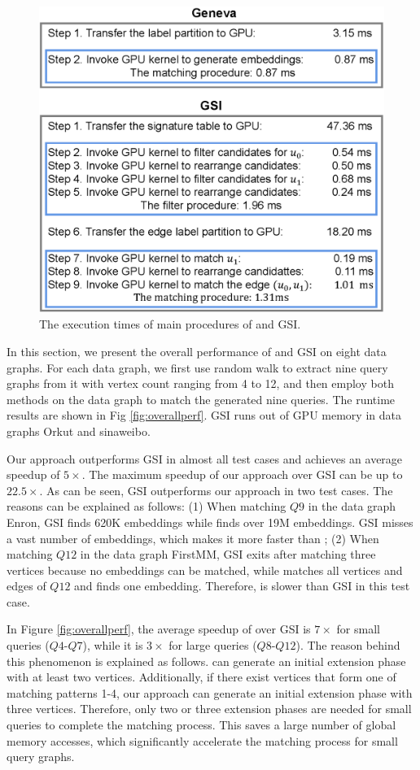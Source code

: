 \begin{figure}
\centering
\includegraphics[width=0.9\columnwidth]{./figure/comparegsi.eps}
\caption{The execution times of main procedures of \SystemName and GSI.}	
\label{fig:compdvgsi}
\end{figure}
In this section, we present the overall performance of \SystemName and GSI on eight data graphs. For each data graph, we first use random
walk to extract nine query graphs from it with vertex count ranging from 4 to 12, and then employ both methods on the data graph to match
the generated nine queries. The runtime results are shown in Fig \ref{fig:overallperf}. GSI runs out of GPU memory in data graphs Orkut and
sinaweibo.

Our approach outperforms GSI in almost all test cases and achieves an average speedup of $5\times$. The maximum speedup of our approach
over GSI can be up to $22.5\times$. As can be seen, GSI outperforms our approach in two test cases. The reasons can be explained as
follows: (1) When matching $Q9$ in the data graph Enron, GSI finds 620K embeddings while \SystemName finds over 19M embeddings. GSI misses
a vast number of embeddings, which makes it more faster than \SystemName; (2) When matching $Q12$ in the data graph FirstMM, GSI exits
after matching three vertices because no embeddings can be matched, while \SystemName matches all vertices and edges of $Q12$ and finds one
embedding. Therefore, \SystemName is slower than GSI in this test case.

In Figure \ref{fig:overallperf}, the average speedup of \SystemName over GSI is $7\times$ for small queries ($Q4$-$Q7$), while it is
$3\times$ for large queries ($Q8$-$Q12$). The reason behind this phenomenon is explained as follows. \SystemName can generate an initial
extension phase with at least two vertices. Additionally, if there exist vertices that form one of matching patterns 1-4, our approach can
generate an initial extension phase with three vertices. Therefore, only two or three extension phases are needed for small queries to
complete the matching process. This saves a large number of global memory accesses, which significantly accelerate the matching process for
small query graphs.

